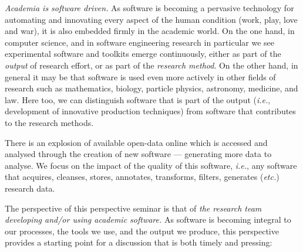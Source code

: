 \documentclass[a4paper,UKenglish]{dagman}
\newcommand{\ie}{\emph{i.e.},\xspace}
\newcommand{\etc}{\emph{etc.}\xspace}
\begin{document}
\emph{Academia is software driven.} As software is becoming a pervasive technology for automating and innovating every aspect of the human condition (work, play, love and war), it is also embedded firmly in the academic world. On the one hand, in computer science, and in software engineering research in particular we see experimental software and toolkits emerge continuously, either as part of the \emph{output} of research effort, or as part of the \emph{research method}. On the other hand, in general it may be that software is used even more actively in other fields of research such as mathematics, biology, particle physics, astronomy, medicine, and law. Here too, we can distinguish software that is part of the output (\ie development of innovative production techniques) from software that contributes to the research methods. 

There is an explosion of available open-data online which is accessed and analysed through the creation of new software --- generating more data to analyse. We focus on the impact of the quality of this software, \ie any software that acquires, cleanses, stores, annotates, transforms, filters, generates (\etc) research data.

The perspective of this perspective seminar is that of \emph{the research team developing and/or using academic software.} 
As software is becoming integral to our processes, the tools we use, and the output we produce, this perspective provides a starting point for a discussion that is both timely and pressing:
\end{document}

